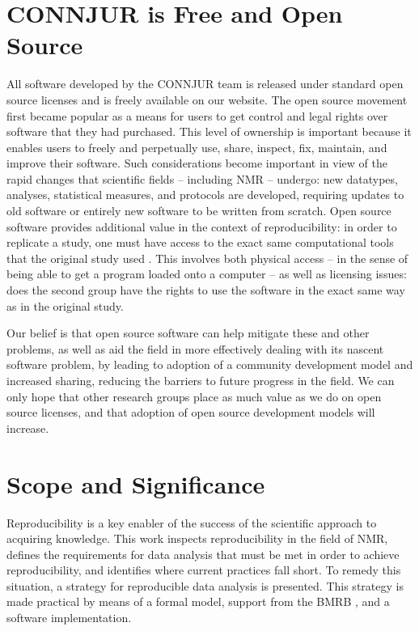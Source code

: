 \section{CONNJUR is Free and Open Source}
All software developed by the CONNJUR team is released under standard open 
source licenses and is freely available on our website.  The open source 
movement first became popular as a means for users to get control and legal 
rights over software that they had purchased.  This level of ownership is 
important because it enables users to freely and perpetually use, share, 
inspect, fix, maintain, and improve their software.  Such considerations 
become important in view of the rapid changes that scientific fields -- 
including NMR -- undergo: new datatypes, analyses, statistical measures, 
and protocols are developed, requiring updates to old software or entirely 
new software to be written from scratch.  Open source software provides 
additional value in the context of reproducibility: in order to replicate a
study, one must have access to the exact same computational tools that the 
original study used \cite{ince2012open}.  
This involves both physical access -- in the sense of 
being able to get a program loaded onto a computer -- as well as licensing 
issues: does the second group have the rights to use the software in the 
exact same way as in the original study.

Our belief is that open source software can help mitigate these and other 
problems, as well as aid the field in more effectively dealing with its 
nascent software problem, by leading to adoption of a community development 
model and increased sharing, reducing the barriers to future progress in 
the field.  We can only hope that other research groups place as much value 
as we do on open source licenses, and that adoption of open source development 
models will increase.  


\section{Scope and Significance}
Reproducibility is a key enabler of the success of the scientific approach to 
acquiring knowledge.  This work inspects reproducibility in the field of NMR, 
defines the requirements for data analysis that must be met in order to achieve 
reproducibility, and identifies where current practices fall short.  To remedy 
this situation, a strategy for reproducible data analysis is presented.  This 
strategy is made practical by means of a formal model, support from the BMRB 
\cite{bmrb}, and a software implementation.


